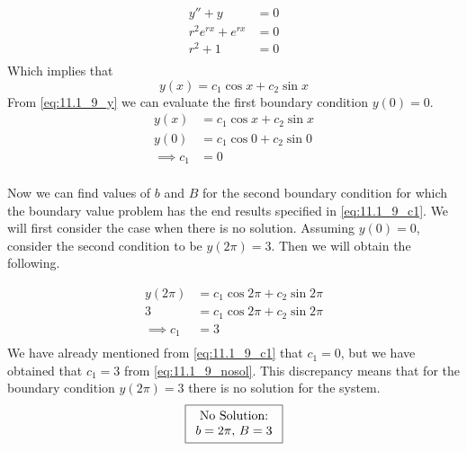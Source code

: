 \documentclass[12pt]{article}
\begin{document}
\begin{equation*}
  \begin{aligned}
    y''+y&=0 \\
    r^2e^{rx}+e^{rx}&=0 \\
    r^2+1&=0 \\
  \end{aligned}
\end{equation*}
Which implies that
\begin{equation}
  \label{eq:11.1_9_y}
  y(x)=c_1\cos x + c_2\sin x
\end{equation}
From \cref{eq:11.1_9_y} we can evaluate the first boundary condition
$y(0)=0$.
\begin{equation}
  \label{eq:11.1_9_c1}
  \begin{aligned}
    y(x)&=c_1\cos x + c_2\sin x \\
    y(0)&=c_1\cos 0 + c_2\sin 0 \\
    \implies c_1&=0 \\
  \end{aligned}
\end{equation}

Now we can find values of $b$ and $B$ for the second boundary
condition for which the boundary value problem has the end results
specified in \cref{eq:11.1_9_c1}. We will first consider the case when
there is no solution. Assuming $y(0)=0$, consider the second condition
to be $y(2\pi)=3$. Then we will obtain the following.

\begin{equation}
  \label{eq:11.1_9_nosol}
  \begin{aligned}
    y(2\pi)&=c_1\cos 2\pi + c_2\sin 2\pi \\
    3&=c_1\cos 2\pi + c_2\sin 2\pi \\
    \implies c_1 &= 3 \\
  \end{aligned}
\end{equation}
We have already mentioned from \cref{eq:11.1_9_c1} that $c_1=0$, but
we have obtained that $c_1=3$ from \cref{eq:11.1_9_nosol}.  This
discrepancy means that for the boundary condition $y(2\pi)=3$ there is
no solution for the system.
\begin{equation*}
\boxed{
  \begin{array}[c]{c}
    \text{No Solution:} \\
    b=2\pi,\,B=3 \\
  \end{array}
}
\end{equation*}
\end{document}
